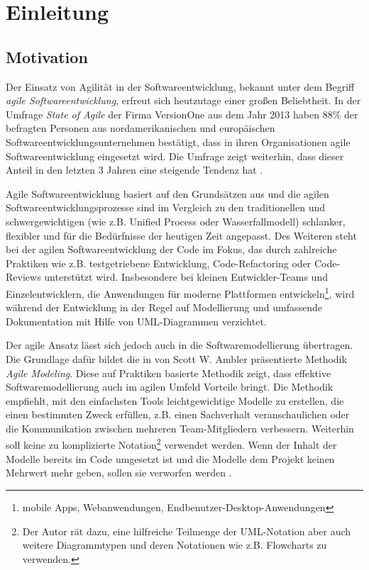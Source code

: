 
\chapter{Einleitung}

\section{Motivation}

Der Einsatz von Agilität in der Softwareentwicklung, bekannt unter dem Begriff \textit{agile Softwareentwicklung}, erfreut sich heutzutage einer großen Beliebtheit. In der Umfrage \textit{State of Agile} der Firma VersionOne aus dem Jahr 2013 haben 88\% der befragten Personen aus nordamerikanischen und europäischen Softwareentwicklungsunternehmen bestätigt, dass in ihren Organisationen agile Softwareentwicklung eingesetzt wird. Die Umfrage zeigt weiterhin, dass dieser Anteil in den letzten 3 Jahren eine steigende Tendenz hat \cite{VersionOne148th-Annual}.

Agile Softwareentwicklung basiert auf den Grundsätzen aus \cite{BeckBeedle01Manifest} und die agilen Softwareentwicklungsprozesse sind im Vergleich zu den traditionellen und schwergewichtigen (wie z.B. Unified Process oder Wasserfallmodell) schlanker, flexibler und für die Bedürfnisse der heutigen Zeit angepasst. Des Weiteren steht bei der agilen Softwareentwicklung der Code im Fokus, das durch zahlreiche Praktiken wie z.B. testgetriebene Entwicklung, Code-Refactoring oder Code-Reviews unterstützt wird. Insbesondere bei kleinen Entwickler-Teams und Einzelentwicklern, die Anwendungen für moderne Plattformen entwickeln\footnote{mobile Apps, Webanwendungen, Endbenutzer-Desktop-Anwendungen}, wird während der Entwicklung in der Regel auf Modellierung und umfassende Dokumentation mit Hilfe von UML-Diagrammen verzichtet.

Der agile Ansatz lässt sich jedoch auch in die Softwaremodellierung übertragen. Die Grundlage dafür bildet die in \cite{Ambler02Agile} von Scott W. Ambler präsentierte Methodik \textit{Agile Modeling}. Diese auf Praktiken basierte Methodik zeigt, dass effektive Softwaremodellierung auch im agilen Umfeld Vorteile bringt. Die Methodik empfiehlt, mit den einfachsten Tools leichtgewichtige Modelle zu erstellen, die einen bestimmten Zweck erfüllen, z.B. einen Sachverhalt  veranschaulichen oder die Kommunikation zwischen mehreren Team-Mitgliedern verbessern. Weiterhin soll keine zu komplizierte Notation\footnote{Der Autor rät dazu, eine hilfreiche Teilmenge der UML-Notation aber auch weitere Diagrammtypen und deren Notationen wie z.B. Flowcharts zu verwenden.} verwendet werden. Wenn der Inhalt der Modelle bereits im Code umgesetzt ist und die Modelle dem Projekt keinen Mehrwert mehr geben, sollen sie verworfen werden \cite{Ambler02Agile}.

